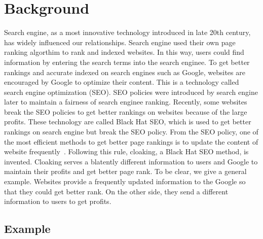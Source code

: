 \section{Background}
\label{s:related-work}
Search engine, as a most innovative technology introduced in late 20th century, has widely influenced our relationships. Search engine used their own page ranking algorthim to rank and indexed websites. In this way, users could find information by entering the search terms into the search enginee. To get better rankings and accurate indexed on search engines such as Google, websites are encouraged by Google to optimize their content. This is a technology called search engine optimization (SEO).
SEO policies were introduced by search engine later to maintain a fairness of search enginee ranking. Recently, some websites break the SEO policies to get better rankings on websites because of the large profits. These technology are called Black Hat SEO, which is used to get better rankings on search engine but break the SEO policy.
From the SEO policy, one of the most efficient methods to get better page rankings is to update the content of website frequently~\cite{wang2011cloak}.
Following this rule, cloaking, a Black Hat SEO method, is invented. Cloaking serves a blatently different information to users and Google to maintain their
profits and get better page rank. To be clear, we give a general example. Websites provide a frequently updated information to the Google so that they could get
better rank. On the other side, they send a different information to users to get profits.

\subsection{Example}


